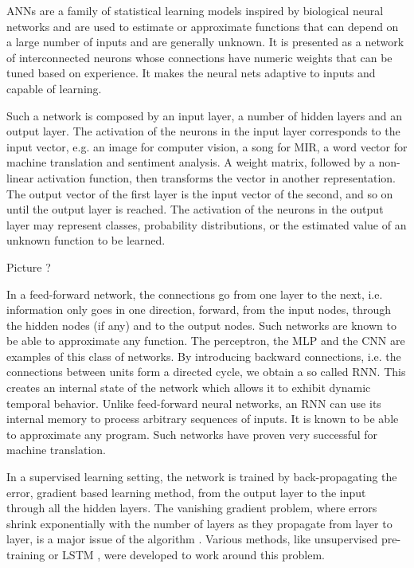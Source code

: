 \documentclass[a4paper,12pt,twoside]{report}
\begin{document}
\gls{ANNs} are a family of statistical learning models inspired by biological neural networks and are used to estimate or approximate functions that can depend on a large number of inputs and are generally unknown. It is presented as a network of interconnected neurons whose connections have numeric weights that can be tuned based on experience. It makes the neural nets adaptive to inputs and capable of learning.

Such a network is composed by an input layer, a number of hidden layers and an output layer. The activation of the neurons in the input layer corresponds to the input vector, e.g. an image for computer vision, a song for \gls{MIR}, a word vector for machine translation and sentiment analysis. A weight matrix, followed by a non-linear activation function, then transforms the vector in another representation. The output vector of the first layer is the input vector of the second, and so on until the output layer is reached. The activation of the neurons in the output layer may represent classes, probability distributions, or the estimated value of an unknown function to be learned.

{\color{red} Picture ?}

In a feed-forward network, the connections go from one layer to the next, i.e. information only goes in one direction, forward, from the input nodes, through the hidden nodes (if any) and to the output nodes. Such networks are known to be able to approximate any function. The perceptron, the \gls{MLP} and the \gls{CNN} are examples of this class of networks.
By introducing backward connections, i.e. the connections between units form a directed cycle, we obtain a so called \gls{RNN}. This creates an internal state of the network which allows it to exhibit dynamic temporal behavior. Unlike feed-forward neural networks, an \gls{RNN} can use its internal memory to process arbitrary sequences of inputs. It is known to be able to approximate any program. Such networks have proven very successful for machine translation.

In a supervised learning setting, the network is trained by back-propagating the error, gradient based learning method, from the output layer to the input through all the hidden layers.
The vanishing gradient problem, where errors shrink exponentially with the number of layers as they propagate from layer to layer, is a major issue of the algorithm \cite{hochreiter2001vanishingGradient}. Various methods, like unsupervised pre-training or \gls{LSTM} \cite{hochreiter1997LSTM}, were developed to work around this problem.
\end{document}
